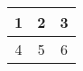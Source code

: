 \documentclass{article}
\begin{document}
\begin{center}
\begin{tabular}
{| c | c | c |}
\hline
1 & 2 & 3\\
\hline
4 & 5 & 6\\
\hline
\end{tabular}
\end{center}
\end{document}
